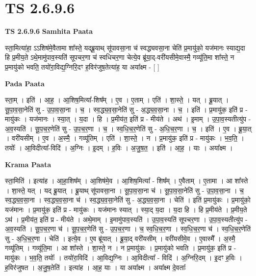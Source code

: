 \documentclass[17pt]{extarticle}
\begin{document}
\section{ TS 2.6.9.6 }

\textbf{TS 2.6.9.6 } \newline
\textbf{Samhita Paata} \newline

स्ता॒मित्या॑हा॒ ऽऽशिष॑मे॒वैतामा शा᳚स्ते॒ यद्ब्रू॒याथ् सू॑पावसा॒ना च॑ स्वद्ध्यवसा॒ना चेति॑ प्र॒मायु॑को॒ यज॑मानः स्याद्य॒दा हि प्र॒मीय॒ते ऽथे॒मामु॑पाव॒स्यति॑ सूपचर॒णा च॑ स्वधिचर॒णा चेत्ये॒व ब्रू॑या॒द्-वरी॑यसीमे॒वास्मै॒ गव्यू॑ति॒मा शा᳚स्ते॒ न प्र॒मायु॑को भवति॒ तयो॑रा॒विद्य॒ग्निरि॒दꣳ ह॒विर॑जुष॒तेत्या॑ह॒ या अया᳚क्ष्म - [  ] \newline

\textbf{Pada Paata} \newline

स्ता॒म् । इति॑ । आ॒ह॒ । आ॒शिष॒मित्या᳚-शिष᳚म् । ए॒व । ए॒ताम् । एति॑ । शा॒स्ते॒ । यत् । ब्रू॒यात् । सू॒पा॒व॒सा॒नेति॑ सु - उ॒पा॒व॒सा॒ना । च॒ । स्व॒द्ध्य॒व॒सा॒नेति॑ सु - अ॒द्ध्य॒व॒सा॒ना । च॒ । इति॑ । प्र॒मायु॑क॒ इति॑ प्र - मायु॑कः । यज॑मानः । स्या॒त् । य॒दा । हि । प्र॒मीय॑त॒ इति॑ प्र - मीय॑ते । अथ॑ । इ॒माम् । उ॒पा॒व॒स्यतीत्यु॑प - अ॒व॒स्यति॑ । सू॒प॒च॒र॒णेति॑ सु - उ॒प॒च॒र॒णा । च॒ । स्व॒धि॒च॒र॒णेति॑ सु - अ॒धि॒च॒र॒णा । च॒ । इति॑ । ए॒व । ब्रू॒या॒त् । वरी॑यसीम् । ए॒व । अ॒स्मै॒ । गव्यू॑तिम् । एति॑ । शा॒स्ते॒ । न । प्र॒मायु॑क॒ इति॑ प्र - मायु॑कः । भ॒व॒ति॒ । तयोः᳚ । आ॒विदीत्या᳚-विदि॑ । अ॒ग्निः । इ॒दम् । ह॒विः । अ॒जु॒ष॒त॒ । इति॑ । आ॒ह॒ । याः । अया᳚क्ष्म ।  \newline


\textbf{Krama Paata} \newline

स्ता॒मिति॑ । इत्या॑ह । आ॒हा॒शिष᳚म् । आ॒शिष॑मे॒व । आ॒शिष॒मित्या᳚ - शिष᳚म् । ए॒वैताम् । ए॒तामा । आ शा᳚स्ते । शा॒स्ते॒ यत् । यद् ब्रू॒यात् । ब्रू॒याथ् सू॑पावसा॒ना । सू॒पा॒व॒सा॒ना च॑ । सू॒पा॒व॒सा॒नेति॑ सु - उ॒पा॒व॒सा॒ना । च॒ स्व॒द्ध्य॒व॒सा॒ना । स्व॒द्ध्य॒व॒सा॒ना च॑ । स्व॒द्ध्य॒व॒सा॒नेति॑ सु - अ॒द्ध्य॒व॒सा॒ना । चेति॑ । इति॑ प्र॒मायु॑कः । प्र॒मायु॑को॒ यज॑मानः । प्र॒मायु॑क॒ इति॑ प्र - मायु॑कः । यज॑मानः स्यात् । स्या॒द् य॒दा । य॒दा हि । हि प्र॒मीय॑ते । प्र॒मीय॒ते ऽथ॑ । प्र॒मीय॑त॒ इति॑ प्र - मीय॑ते । अथे॒माम् । इ॒मामु॑पाव॒स्यति॑ । उ॒पा॒व॒स्यति॑ सूपचर॒णा । उ॒पा॒व॒स्यतीत्यु॑प - अ॒व॒स्यति॑ । सू॒प॒च॒र॒णा च॑ । सू॒प॒च॒र॒णेति॑ सु - उ॒प॒च॒र॒णा । च॒ स्व॒धि॒च॒र॒णा । स्व॒धि॒च॒र॒णा च॑ । स्व॒धि॒च॒र॒णेति॑ सु - अ॒धि॒च॒र॒णा । चेति॑ । इत्ये॒व । ए॒व ब्रू॑यात् । ब्रू॒या॒द् वरी॑यसीम् । वरी॑यसीमे॒व । ए॒वास्मै᳚ । अ॒स्मै॒ गव्यू॑तिम् । गव्यू॑ति॒मा । आ शा᳚स्ते । शा॒स्ते॒ न । न प्र॒मायु॑कः । प्र॒मायु॑को भवति । प्र॒मायु॑क॒ इति॑ प्र - मायु॑कः । भ॒व॒ति॒ तयोः᳚ । तयो॑रा॒विदि॑ । आ॒विद्य॒ग्निः । आ॒विदीत्या᳚ - विदि॑ । अ॒ग्निरि॒दम् । इ॒दꣳ ह॒विः । ह॒विर॑जुषत । अ॒जु॒ष॒तेति॑ । इत्या॑ह । आ॒ह॒ याः । या अया᳚क्ष्म । अया᳚क्ष्म दे॒वताः᳚ \newline
\end{document}
